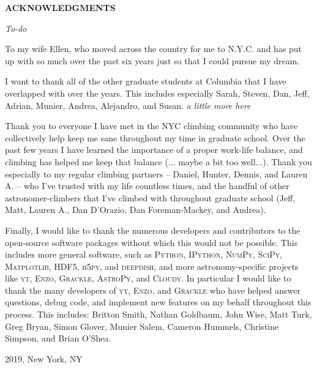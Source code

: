 %
%
%
%

\newpage

\begin{center}

{\large \bf ACKNOWLEDGMENTS } %

\end{center}

\vspace{0.8cm}
\textit{To-do}

To my wife Ellen, who moved across the country for me to N.Y.C. and has put up
with so much over the past six years just so that I could pursue my dream.

I want to thank all of the other graduate students at Columbia that I have overlapped
with over the years. This includes especially Sarah, Steven, Dan, Jeff, Adrian,
Munier, Andrea, Alejandro, and Susan. \textit{a little more here}

Thank you to everyone I have met in the NYC climbing community who have collectively
help keep me sane throughout my time in graduate school. Over the past few years
I have learned the importance of a proper work-life balance, and climbing has helped
me keep that balance (... maybe a bit too well...). Thank you especially to my
regular climbing partners -- Daniel, Hunter, Dennis, and Lauren A. -- who I've trusted
with my life countless times, and the handful of other astronomer-climbers that I've
climbed with throughout graduate school (Jeff, Matt, Lauren A., Dan D'Orazio,
Dan Foreman-Mackey, and Andrea).

Finally, I would like to thank the numerous developers and contributors to the
open-source software packages without which this \dissertation would not be
possible. This includes more general software, such as \textsc{Python}, \textsc{IPython}, \textsc{NumPy},
\textsc{SciPy}, \textsc{Matplotlib}, \textsc{HDF5}, \textsc{h5py},
and \textsc{deepdish}, and more astronomy-specific projects like  \textsc{yt}, \textsc{Enzo},
\textsc{Grackle}, \textsc{AstroPy}, and \textsc{Cloudy}. In particular I would like
to thank the many developers of \textsc{yt}, \textsc{Enzo}, and \textsc{Grackle}
who have helped answer questions, debug code, and implement new features on
my behalf throughout this process. This includes: Britton Smith, Nathan Goldbaum,
John Wise, Matt Turk, Greg Bryan, Simon Glover, Munier Salem, Cameron Hummels,
Christine Simpson, and Brian O'Shea. 

\vspace{1.8cm}
2019, New York, NY

